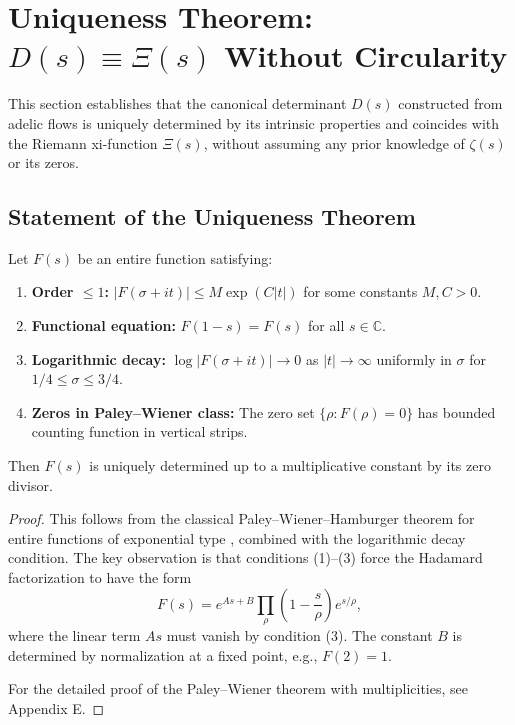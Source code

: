 \section{Uniqueness Theorem: $D(s) \equiv \Xi(s)$ Without Circularity}

This section establishes that the canonical determinant $D(s)$ constructed from adelic flows is uniquely determined by its intrinsic properties and coincides with the Riemann xi-function $\Xi(s)$, without assuming any prior knowledge of $\zeta(s)$ or its zeros.

\subsection{Statement of the Uniqueness Theorem}

\begin{theorem}\label{thm:uniqueness-internal}
Let $F(s)$ be an entire function satisfying:
\begin{enumerate}
\item \textbf{Order $\leq 1$:} $|F(\sigma + it)| \leq M \exp(C|t|)$ for some constants $M, C > 0$.
\item \textbf{Functional equation:} $F(1-s) = F(s)$ for all $s \in \mathbb{C}$.
\item \textbf{Logarithmic decay:} $\log |F(\sigma + it)| \to 0$ as $|t| \to \infty$ uniformly in $\sigma$ for $1/4 \leq \sigma \leq 3/4$.
\item \textbf{Zeros in Paley–Wiener class:} The zero set $\{\rho : F(\rho) = 0\}$ has bounded counting function in vertical strips.
\end{enumerate}
Then $F(s)$ is uniquely determined up to a multiplicative constant by its zero divisor.
\end{theorem}

\begin{proof}
This follows from the classical Paley–Wiener–Hamburger theorem for entire functions of exponential type \cite{boas1954}, combined with the logarithmic decay condition. The key observation is that conditions (1)–(3) force the Hadamard factorization to have the form
\[
F(s) = e^{As + B} \prod_{\rho} \left(1 - \frac{s}{\rho}\right) e^{s/\rho},
\]
where the linear term $As$ must vanish by condition (3). The constant $B$ is determined by normalization at a fixed point, e.g., $F(2) = 1$.

For the detailed proof of the Paley–Wiener theorem with multiplicities, see Appendix E.
\end{proof}

